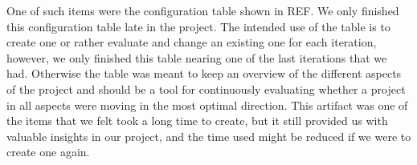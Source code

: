 
One of such items were the configuration table shown in REF. We only finished this configuration table late in the project. The intended use of the table is to create one or rather evaluate and change an existing one for each iteration, however, we only finished this table nearing one of the last iterations that we had. Otherwise the table was meant to keep an overview of the different aspects of the project and should be a tool for continuously evaluating whether a project in all aspects were moving in the most optimal direction. This artifact was one of the items that we felt took a long time to create, but it still provided us with valuable insights in our project, and the time used might be reduced if we were to create one again.


